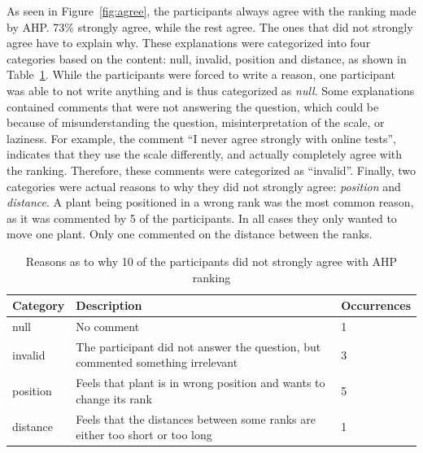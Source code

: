 As seen in Figure~\ref{fig:agree}, the participants always agree with the ranking made by AHP.
73\% strongly agree, while the rest agree.
The ones that did not strongly agree have to explain why.
These explanations were categorized into four categories based on the content: null, invalid, position and distance, as shown in Table~\ref{tab:agree-why}.
While the participants were forced to write a reason, one participant was able to not write anything and is thus categorized as \textit{null}.
Some explanations contained comments that were not answering the question, which could be because of misunderstanding the question, misinterpretation of the scale, or laziness.
For example, the comment ``I never agree strongly with online tests'', indicates that they use the scale differently, and actually completely agree with the ranking.
Therefore, these comments were categorized as ``invalid''.
Finally, two categories were actual reasons to why they did not strongly agree: \textit{position} and \textit{distance}.
A plant being positioned in a wrong rank was the most common reason, as it was commented by 5 of the participants.
In all cases they only wanted to move one plant.
Only one commented on the distance between the ranks.

\begin{table}
    \centering
    \begin{tabularx}{\textwidth}{| l | X | l |}
    \hline
    \textbf{Category} & \textbf{Description} & \textbf{Occurrences} \\ \hline
    null & No comment & 1 \\
    \hline
    invalid & The participant did not answer the question, but commented something irrelevant & 3 \\
    \hline
    position & Feels that plant is in wrong position and wants to change its rank & 5 \\
    \hline
    distance & Feels that the distances between some ranks are either too short or too long & 1 \\
    \hline
    \end{tabularx}
    \caption{Reasons as to why 10 of the participants did not strongly agree with AHP ranking}
    \label{tab:agree-why}
\end{table}

